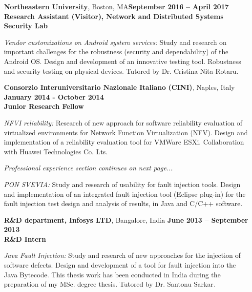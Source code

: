 \documentclass[margin,line]{resume}
\begin{document}
\begin{resume}
\textbf{Northeastern University}, Boston, MA\hfill\textbf{September 2016 -- April 2017}\\
\textbf{Research Assistant (Visitor), Network and Distributed Systems Security Lab}\hfill 
\vspace{-3mm}\\\vspace{-1mm}
\begin{list2}
	\item \filbreak\textit{Vendor customizations on Android system services:} Study and research on important challenges for the robustness (security and dependability) of the Android OS. Design and development of an innovative testing tool. Robustness and security testing on physical devices. Tutored by Dr. Cristina Nita-Rotaru.
\end{list2}

\textbf{Consorzio Interuniversitario Nazionale Italiano (CINI)}, Naples, Italy\\
\null\hfill\textbf{January 2014 - October 2014}\\
\textbf{Junior Research Fellow}\hfill 
\vspace{-3mm}\\\vspace{-1mm}
\begin{list2}
	\item \filbreak\textit{NFVI reliability:} Research of new approach for software reliability evaluation of virtualized environments for Network Function Virtualization (NFV). Design and implementation of a reliability evaluation tool for VMWare ESXi. Collaboration with Huawei Technologies Co. Lts.
	\item[] \item[] \hfill \textit{Professional experience section continues on next page...}
	\item \filbreak\textit{PON SVEVIA:} Study and research of usability for fault injection tools. Design and implementation of an integrated fault injection tool (Eclipse plug-in) for the fault injection test design and analysis of results, in Java and C/C++ software.
\end{list2}

\filbreak
\textbf{R\&D department, Infosys LTD}, Bangalore, India\hfill
\textbf{June 2013 -- September 2013}\\
\textbf{R\&D Intern}\hfill 
\vspace{-3mm}\\\vspace{-1mm}
\begin{list2}
    \item \filbreak\textit{Java Fault Injection:} Study and research of new approaches for the injection of software defects. Design and development of a tool for fault injection into the Java Bytecode. This thesis work has been conducted in India during the preparation of my MSc. degree thesis. Tutored by Dr. Santonu Sarkar.
\end{list2}


\end{resume}
\end{document}
